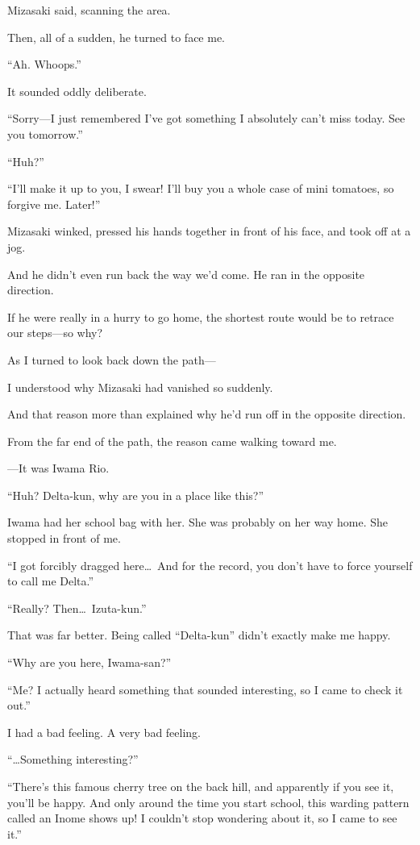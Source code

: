 \documentclass[
    a4paper,
    12pt,
    twoside,
    openany,
    UTF8,
    fontset=windows
]{ctexbook}
\begin{document}
Mizasaki said, scanning the area.

Then, all of a sudden, he turned to face me.

``Ah. Whoops.''

It sounded oddly deliberate.

``Sorry---I just remembered I've got something I absolutely can't miss today. See you tomorrow.''

``Huh?''

``I'll make it up to you, I swear! I'll buy you a whole case of mini tomatoes, so forgive me. Later!''

Mizasaki winked, pressed his hands together in front of his face, and took off at a jog.

And he didn't even run back the way we'd come. He ran in the opposite direction.

If he were really in a hurry to go home, the shortest route would be to retrace our steps---so why?

As I turned to look back down the path---

I understood why Mizasaki had vanished so suddenly.

And that reason more than explained why he'd run off in the opposite direction.

From the far end of the path, the reason came walking toward me.

---It was Iwama Rio.

``Huh? Delta-kun, why are you in a place like this?''

Iwama had her school bag with her. She was probably on her way home. She stopped in front of me.

``I got forcibly dragged here\dots\ And for the record, you don't have to force yourself to call me Delta.''

``Really? Then\dots\ Izuta-kun.''

That was far better. Being called ``Delta-kun'' didn't exactly make me happy.

``Why are you here, Iwama-san?''

``Me? I actually heard something that sounded interesting, so I came to check it out.''

I had a bad feeling. A very bad feeling.

``\dots Something interesting?''

``There's this famous cherry tree on the back hill, and apparently if you see it, you'll be happy. And only around the time you start school, this warding pattern called an Inome shows up! I couldn't stop wondering about it, so I came to see it.''
\end{document}
